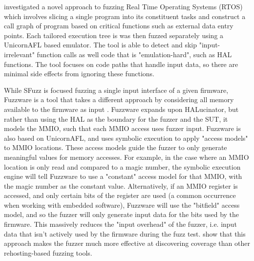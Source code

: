 \documentclass[../report.tex]{subfiles}
\begin{document}
\citet{Chen_2022} investigated a novel approach to fuzzing Real Time Operating
Systems (RTOS) which involves slicing a single program into its constituent
tasks and construct a call graph of program based on critical functions such as
external data entry points. Each tailored execution tree is was then fuzzed
separately using a UnicornAFL based emulator. The tool is able to detect and
skip "input-irrelevant" function calls as well code that is "emulation-hard",
such as HAL functions. The tool focuses on code paths that handle input data,
so there are minimal side effects from ignoring these functions.

While SFuzz is focused fuzzing a single input interface of a given firmware,
Fuzzware is a tool that takes a different approach by considering all memory
available to the firmware as input \citep{Fuzzware_2022}. Fuzzware expands upon
HALucinator, but rather than using the HAL as the boundary for the fuzzer and
the SUT, it models the MMIO, such that each MMIO access uses fuzzer input.
Fuzzware is also based on UnicornAFL, and uses symbolic execution to apply
"access models" to MMIO locations. These access models guide the fuzzer to only
generate meaningful values for memory accesses. For example, in the case where
an MMIO location is only read and compared to a magic number, the symbolic
execution engine will tell Fuzzware to use a "constant" access model for that
MMIO, with the magic number as the constant value. Alternatively, if an MMIO
register is accessed, and only certain bits of the register are used (a common
occurrence when working with embedded software), Fuzzware will use the
"bitfield" access model, and so the fuzzer will only generate input data for
the bits used by the firmware. This massively reduces the "input overhead" of
the fuzzer, i.e. input data that isn't actively used by the firmware during the
fuzz test. \citet{Fuzzware_2022} show that this approach makes the fuzzer much
more effective at discovering coverage than other rehosting-based fuzzing
tools.
\end{document}
